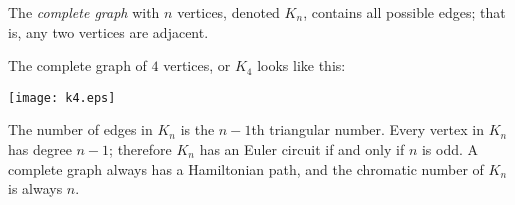 \documentclass[12pt]{article}
\begin{document}
The \emph{complete graph} with $n$ vertices, denoted $K_n$, contains all possible edges; that is, any two vertices are adjacent.

The complete graph of $4$ vertices, or $K_4$ looks like this:

\begin{center}
\texttt{[image: k4.eps]}
\end{center}

The number of edges in $K_n$ is the $n-1$th triangular number.  Every vertex in $K_n$ has degree $n-1$; therefore $K_n$ has an Euler circuit if and only if $n$ is odd.  A complete graph always has a Hamiltonian path, and the chromatic number of $K_n$ is always $n$.
\end{document}
